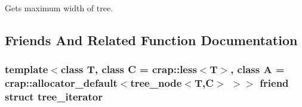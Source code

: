 Gets maximum width of tree. 



\subsection{Friends And Related Function Documentation}
\hypertarget{classcrap_1_1binary__tree_aab327068d678315bfc662fe2fcbb247e}{
\subsubsection[{tree\-\_\-iterator}]{\setlength{\rightskip}{0pt plus 5cm}template$<$class T, class C = crap\-::less$<$\-T$>$, class A = crap\-::allocator\-\_\-default$<$tree\-\_\-node$<$\-T,\-C$>$ $>$$>$ friend struct {\bf tree\-\_\-iterator}\hspace{0.3cm}{\ttfamily [friend]}}}\label{classcrap_1_1binary__tree_aab327068d678315bfc662fe2fcbb247e}


